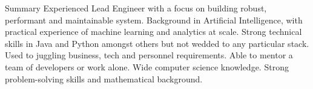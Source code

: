 \documentclass{resume} %
\begin{document}

\begin{rSection}{Summary}
Experienced Lead Engineer with a focus on building robust, performant and maintainable system. Background in Artificial Intelligence, with practical experience of machine learning and analytics at scale. Strong technical skills in Java and Python amongst others but not wedded to any particular stack. Used to juggling business, tech and personnel requirements. Able to mentor a team of developers or work alone. Wide computer science knowledge. Strong problem-solving skills and mathematical background.
\end{rSection}

\end{document}
